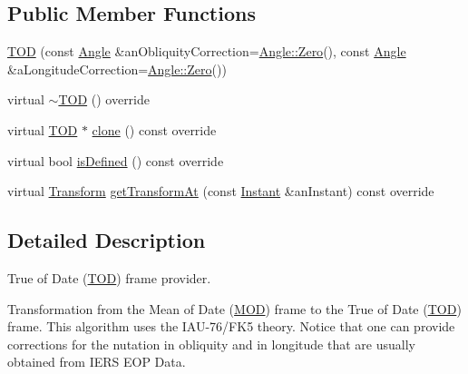 \subsection*{Public Member Functions}
\begin{DoxyCompactItemize}
\item 
\hyperlink{classostk_1_1physics_1_1coord_1_1frame_1_1provider_1_1_t_o_d_ad04e95c1ab8ccfca5f6ed3c8d51639d4}{T\+OD} (const \hyperlink{classostk_1_1physics_1_1units_1_1_angle}{Angle} \&an\+Obliquity\+Correction=\hyperlink{classostk_1_1physics_1_1units_1_1_angle_a4454975f87e5d3532cf8b819819207e7}{Angle\+::\+Zero}(), const \hyperlink{classostk_1_1physics_1_1units_1_1_angle}{Angle} \&a\+Longitude\+Correction=\hyperlink{classostk_1_1physics_1_1units_1_1_angle_a4454975f87e5d3532cf8b819819207e7}{Angle\+::\+Zero}())
\item 
virtual \hyperlink{classostk_1_1physics_1_1coord_1_1frame_1_1provider_1_1_t_o_d_a1e59c3f3d3d31e768deb99abb502b577}{$\sim$\+T\+OD} () override
\item 
virtual \hyperlink{classostk_1_1physics_1_1coord_1_1frame_1_1provider_1_1_t_o_d}{T\+OD} $\ast$ \hyperlink{classostk_1_1physics_1_1coord_1_1frame_1_1provider_1_1_t_o_d_ad374cdce01f5872311b61695502dd4e4}{clone} () const override
\item 
virtual bool \hyperlink{classostk_1_1physics_1_1coord_1_1frame_1_1provider_1_1_t_o_d_a57f8d993ac693b2cd39b4a99faadc92f}{is\+Defined} () const override
\item 
virtual \hyperlink{classostk_1_1physics_1_1coord_1_1_transform}{Transform} \hyperlink{classostk_1_1physics_1_1coord_1_1frame_1_1provider_1_1_t_o_d_adc74a9cba68df62bf135f5ee775bd4a1}{get\+Transform\+At} (const \hyperlink{classostk_1_1physics_1_1time_1_1_instant}{Instant} \&an\+Instant) const override
\end{DoxyCompactItemize}


\subsection{Detailed Description}
True of Date (\hyperlink{classostk_1_1physics_1_1coord_1_1frame_1_1provider_1_1_t_o_d}{T\+OD}) frame provider. 

Transformation from the Mean of Date (\hyperlink{classostk_1_1physics_1_1coord_1_1frame_1_1provider_1_1_m_o_d}{M\+OD}) frame to the True of Date (\hyperlink{classostk_1_1physics_1_1coord_1_1frame_1_1provider_1_1_t_o_d}{T\+OD}) frame. This algorithm uses the I\+A\+U-\/76/\+F\+K5 theory. Notice that one can provide corrections for the nutation in obliquity and in longitude that are usually obtained from I\+E\+RS E\+OP Data.

